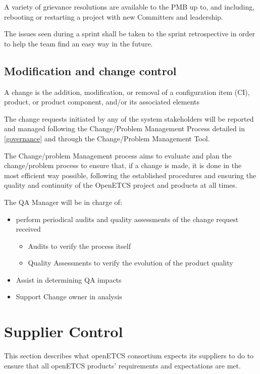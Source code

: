\documentclass{template/openetcs_article}
\begin{document}
A variety of grievance resolutions are available to the PMB up to, and including, rebooting or restarting a project with new Committers and leadership.

The issues seen during a sprint shall be taken to the sprint retrospective in order to help the team find an easy way in the future.

\subsection{Modification and change control }

A change is the addition, modification, or removal of a configuration item (CI), product, or product component, and/or its associated elements

The change requests initiated by any of the system stakeholders will be reported and managed following the Change/Problem Management Process  \citep{emp} detailed in \href{https://github.com/openETCS/governance/tree/master/Change-Problem%20Process}{[governance]} and through the Change/Problem Management Tool.

The Change/problem Management process aims to evaluate and plan the change/problem process to ensure that, if a change is made, it is done in the most efficient way possible, following the established procedures and ensuring the quality and continuity of the OpenETCS project and products at all times.

The QA Manager will be in charge of:
\begin{itemize}
\item perform periodical audits and quality assessments of the change request received
\begin{itemize}
\item Audits to verify the process itself
\item Quality Assessments to verify the evolution of the product quality
\end{itemize}
\item Assist in determining QA impacts
\item Support Change owner in analysis
\end{itemize}


\section{Supplier Control}


This section describes what openETCS consortium expects its suppliers to do to
ensure that all openETCS products' requirements and expectations are met.
\end{document}
